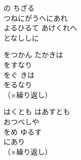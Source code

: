 ﻿\documentclass[10pt,a5j]{tarticle} %
\begin{document}
\vspace{1.5em}
\begin{enumerate}
	\begin{minipage}[c]{\blocksize}
	
		\vspace{\linespace}
		\item
		の
		ちざる\\
		つねにがうへにあれ\\
		よるひるて
		あけくれへ\\
		となししに\\

	\end{minipage}
	\begin{minipage}[c]{\blocksize}

		\vspace{\linespace}
		\item
		をつかん
		たかきは\\
		をすなり\\
		をぐ
		きは\\
		をるなり\\
		（※繰り返し）
	
	\end{minipage}
	\begin{minipage}[c]{\blocksize}
		
		\vspace{\linespace}
		\item
		はくとも
		はあすとも\\
		おつべしや\\
		をめ
		ゆるす\\
		にあり\\
		（※繰り返し）
	

\end{minipage}
\end{enumerate}
\end{document}

